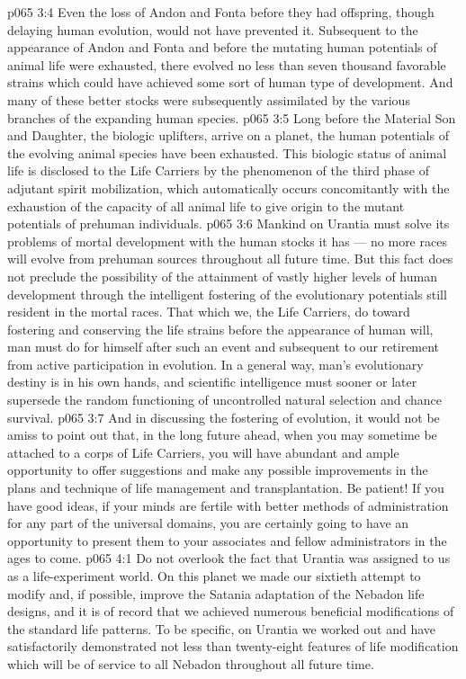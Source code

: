 \vs p065 3:4 \pc Even the loss of Andon and Fonta before they had offspring, though delaying human evolution, would not have prevented it. Subsequent to the appearance of Andon and Fonta and before the mutating human potentials of animal life were exhausted, there evolved no less than seven thousand favorable strains which could have achieved some sort of human type of development. And many of these better stocks were subsequently assimilated by the various branches of the expanding human species.
\vs p065 3:5 Long before the Material Son and Daughter, the biologic uplifters, arrive on a planet, the human potentials of the evolving animal species have been exhausted. This biologic status of animal life is disclosed to the Life Carriers by the phenomenon of the third phase of adjutant spirit mobilization, which automatically occurs concomitantly with the exhaustion of the capacity of all animal life to give origin to the mutant potentials of prehuman individuals.
\vs p065 3:6 \pc Mankind on Urantia must solve its problems of mortal development with the human stocks it has --- no more races will evolve from prehuman sources throughout all future time. But this fact does not preclude the possibility of the attainment of vastly higher levels of human development through the intelligent fostering of the evolutionary potentials still resident in the mortal races. That which we, the Life Carriers, do toward fostering and conserving the life strains before the appearance of human will, man must do for himself after such an event and subsequent to our retirement from active participation in evolution. In a general way, man’s evolutionary destiny is in his own hands, and scientific intelligence must sooner or later supersede the random functioning of uncontrolled natural selection and chance survival.
\vs p065 3:7 And in discussing the fostering of evolution, it would not be amiss to point out that, in the long future ahead, when you may sometime be attached to a corps of Life Carriers, you will have abundant and ample opportunity to offer suggestions and make any possible improvements in the plans and technique of life management and transplantation. Be patient! If you have good ideas, if your minds are fertile with better methods of administration for any part of the universal domains, you are certainly going to have an opportunity to present them to your associates and fellow administrators in the ages to come.
\vs p065 4:1 Do not overlook the fact that Urantia was assigned to us as a life\hyp{}experiment world. On this planet we made our sixtieth attempt to modify and, if possible, improve the Satania adaptation of the Nebadon life designs, and it is of record that we achieved numerous beneficial modifications of the standard life patterns. To be specific, on Urantia we worked out and have satisfactorily demonstrated not less than twenty\hyp{}eight features of life modification which will be of service to all Nebadon throughout all future time.
